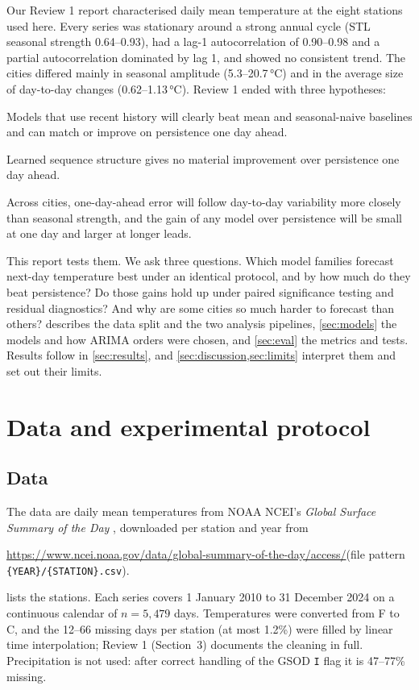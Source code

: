 \documentclass[11pt,a4paper]{article}
\newcommand{\degC}{\,\si{\degreeCelsius}}
\newcommand{\code}[1]{\texttt{#1}}
\begin{document}
Our Review 1 report characterised daily mean temperature at the eight stations used here. Every series was stationary around a strong annual cycle (STL seasonal strength 0.64--0.93), had a lag-1 autocorrelation of 0.90--0.98 and a partial autocorrelation dominated by lag 1, and showed no consistent trend. The cities differed mainly in seasonal amplitude (5.3--20.7\degC) and in the average size of day-to-day changes (0.62--1.13\degC). Review 1 ended with three hypotheses:
\begin{description}[style=nextline,leftmargin=1.2em]
  \item[H1] Models that use recent history will clearly beat mean and seasonal-naive baselines and can match or improve on persistence one day ahead.
  \item[H0] Learned sequence structure gives no material improvement over persistence one day ahead.
  \item[H2] Across cities, one-day-ahead error will follow day-to-day variability more closely than seasonal strength, and the gain of any model over persistence will be small at one day and larger at longer leads.
\end{description}

This report tests them. We ask three questions. Which model families forecast next-day temperature best under an identical protocol, and by how much do they beat persistence? Do those gains hold up under paired significance testing and residual diagnostics? And why are some cities so much harder to forecast than others?  describes the data split and the two analysis pipelines, \cref{sec:models} the models and how ARIMA orders were chosen, and \cref{sec:eval} the metrics and tests. Results follow in \cref{sec:results}, and \cref{sec:discussion,sec:limits} interpret them and set out their limits.

\section{Data and experimental protocol}
\label{sec:protocol}

\subsection{Data}

The data are daily mean temperatures from NOAA NCEI's \emph{Global Surface Summary of the Day} \citep{ncei_gsod}, downloaded per station and year from
\begin{center}
\small\url{https://www.ncei.noaa.gov/data/global-summary-of-the-day/access/}\quad(file pattern \code{\{YEAR\}/\{STATION\}.csv}).
\end{center}
 lists the stations. Each series covers 1 January 2010 to 31 December 2024 on a continuous calendar of $n = 5{,}479$ days. Temperatures were converted from \textdegree F to \textdegree C, and the 12--66 missing days per station (at most 1.2\%) were filled by linear time interpolation; Review 1 (Section~3) documents the cleaning in full. Precipitation is not used: after correct handling of the GSOD \code{I} flag it is 47--77\% missing.
\end{document}
